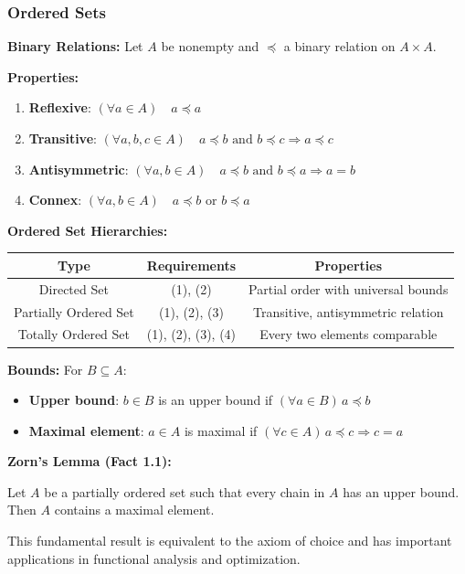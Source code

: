 \documentclass[aspectratio=169,10pt]{beamer}
\begin{document}
\begin{frame}[allowframebreaks]
\frametitle{Ordered Sets}

\textbf{Binary Relations:} Let $A$ be nonempty and $\preceq$ a binary relation on $A \times A$.

\textbf{Properties:}
\begin{enumerate}
\item \textbf{Reflexive}: $(\forall a \in A) \quad a \preceq a$
\item \textbf{Transitive}: $(\forall a,b,c \in A) \quad a \preceq b \text{ and } b \preceq c \Rightarrow a \preceq c$
\item \textbf{Antisymmetric}: $(\forall a,b \in A) \quad a \preceq b \text{ and } b \preceq a \Rightarrow a = b$
\item \textbf{Connex}: $(\forall a,b \in A) \quad a \preceq b \text{ or } b \preceq a$
\end{enumerate}

\framebreak

\textbf{Ordered Set Hierarchies:}

\begin{table}[h]
\centering
\begin{tabular}{|c|c|c|}
\hline
\textbf{Type} & \textbf{Requirements} & \textbf{Properties} \\
\hline
Directed Set & (1), (2) & Partial order with universal bounds \\
Partially Ordered Set & (1), (2), (3) & Transitive, antisymmetric relation \\
Totally Ordered Set & (1), (2), (3), (4) & Every two elements comparable \\
\hline
\end{tabular}
\end{table}

\vspace{0.5cm}

\textbf{Bounds:} For $B \subseteq A$:
\begin{itemize}
\item \textbf{Upper bound}: $b \in B$ is an upper bound if $(\forall a \in B) \, a \preceq b$
\item \textbf{Maximal element}: $a \in A$ is maximal if $(\forall c \in A) \, a \preceq c \Rightarrow c = a$
\end{itemize}

\framebreak

\textbf{Zorn's Lemma (Fact 1.1):}
\begin{theorem}
Let $A$ be a partially ordered set such that every chain in $A$ has an upper bound. Then $A$ contains a maximal element.
\end{theorem}

\vspace{0.3cm}

This fundamental result is equivalent to the axiom of choice and has important applications in functional analysis and optimization.

\end{frame}
\end{document}
